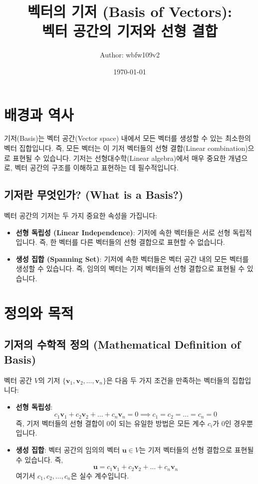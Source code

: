\documentclass[12pt]{article}
\title{
    벡터의 기저 (Basis of Vectors): \\
    벡터 공간의 기저와 선형 결합
}
\author{Author: wbfw109v2}
\date{\today}
\begin{document}
\maketitle
\tableofcontents

\section{배경과 역사}

\noindent 기저(Basis)는 벡터 공간(Vector space) 내에서 모든 벡터를 생성할 수 있는 최소한의 벡터 집합입니다. 즉, 모든 벡터는 이 기저 벡터들의 선형 결합(Linear combination)으로 표현될 수 있습니다. 기저는 선형대수학(Linear algebra)에서 매우 중요한 개념으로, 벡터 공간의 구조를 이해하고 표현하는 데 필수적입니다.

\subsection{기저란 무엇인가? (What is a Basis?)}

\noindent 벡터 공간의 기저는 두 가지 중요한 속성을 가집니다:
\begin{itemize}
  \item \textbf{선형 독립성 (Linear Independence)}: 기저에 속한 벡터들은 서로 선형 독립적입니다. 즉, 한 벡터를 다른 벡터들의 선형 결합으로 표현할 수 없습니다.
  \item \textbf{생성 집합 (Spanning Set)}: 기저에 속한 벡터들은 벡터 공간 내의 모든 벡터를 생성할 수 있습니다. 즉, 임의의 벡터는 기저 벡터들의 선형 결합으로 표현될 수 있습니다.
\end{itemize}

\section{정의와 목적}

\subsection{기저의 수학적 정의 (Mathematical Definition of Basis)}

\noindent 벡터 공간 \( V \)의 기저 \( \{ \mathbf{v}_1, \mathbf{v}_2, \dots, \mathbf{v}_n \} \)은 다음 두 가지 조건을 만족하는 벡터들의 집합입니다:
\begin{itemize}
  \item \textbf{선형 독립성}:
        \[
          c_1 \mathbf{v}_1 + c_2 \mathbf{v}_2 + \dots + c_n \mathbf{v}_n = 0 \implies c_1 = c_2 = \dots = c_n = 0
        \]
        즉, 기저 벡터들의 선형 결합이 0이 되는 유일한 방법은 모든 계수 \( c_i \)가 0인 경우뿐입니다.

  \item \textbf{생성 집합}: 벡터 공간의 임의의 벡터 \( \mathbf{u} \in V \)는 기저 벡터들의 선형 결합으로 표현될 수 있습니다. 즉,
        \[
          \mathbf{u} = c_1 \mathbf{v}_1 + c_2 \mathbf{v}_2 + \dots + c_n \mathbf{v}_n
        \]
        여기서 \( c_1, c_2, \dots, c_n \)은 실수 계수입니다.
\end{itemize}
\end{document}
